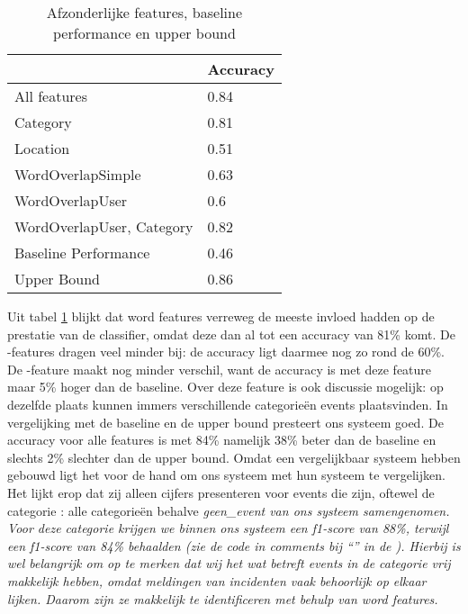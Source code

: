 {{\begin{table}[H]
\centering
\begin{tabular}{|l|l|}
\hline
                          & Accuracy \\ \hline
All features              & 0.84     \\ \hline
Category                  & 0.81     \\ \hline
Location                  & 0.51     \\ \hline
WordOverlapSimple         & 0.63     \\ \hline
WordOverlapUser           & 0.6      \\ \hline
WordOverlapUser, Category & 0.82     \\ \hline
Baseline Performance      & 0.46     \\ \hline
Upper Bound               & 0.86     \\ \hline
\end{tabular}
\caption{Afzonderlijke features, baseline performance en upper bound}\label{testfeatures}
\end{table}

Uit tabel \ref{testfeatures} blijkt dat word features verreweg de meeste invloed hadden op de prestatie van de classifier, omdat deze dan al tot een accuracy
van 81\% komt. De -features dragen veel minder bij: de accuracy ligt daarmee nog zo rond de 60\%. De -feature maakt
nog minder verschil, want de accuracy is met deze feature maar 5\% hoger dan de baseline. Over deze feature is ook discussie
mogelijk: op dezelfde plaats kunnen immers verschillende categorie\"en events plaatsvinden.
\vl
In vergelijking met de baseline en de upper bound presteert ons systeem goed. De accuracy voor alle features is met 84\% namelijk 38\% beter dan de baseline
en slechts 2\% slechter dan de upper bound. Omdat \citeauthor{walther2013geo} een vergelijkbaar systeem hebben gebouwd ligt het voor
de hand om ons systeem met hun systeem te vergelijken. Het lijkt erop dat zij alleen cijfers presenteren voor events die  zijn, oftewel de categorie : alle categorie\"en behalve \it{geen\_event} van ons systeem samengenomen. Voor deze categorie
krijgen we binnen ons systeem een f1-score van 88\%, terwijl \citeauthor{walther2013geo} een f1-score van 84\% behaalden (zie de code
in comments bij ``'' in de ). Hierbij is wel belangrijk om op te merken dat wij
het wat betreft events in de categorie  vrij makkelijk hebben, omdat meldingen van incidenten vaak behoorlijk op elkaar lijken. Daarom 
zijn ze makkelijk te identificeren met behulp van word features.

}}
